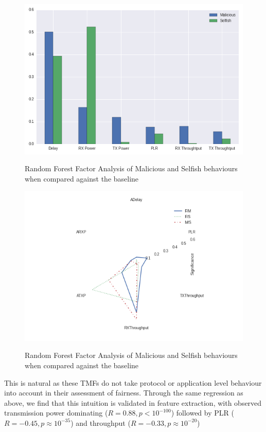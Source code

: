 \documentclass[conference]{IEEEtran}
\begin{document}
\begin{figure}
  \centering
  \includegraphics[width=0.95\linewidth]{img/MaliciousSelfishMetricFactors}\label{fig:malselfactors}
  \caption{Random Forest Factor Analysis of Malicious and Selfish behaviours when compared against the baseline}
\end{figure}
\begin{figure}
  \centering
  \includegraphics[width=0.95\linewidth]{img/MaliciousSelfishMetricFactorsRad}\label{fig:malselfactorsrad}
  \caption{Random Forest Factor Analysis of Malicious and Selfish behaviours when compared against the baseline}
\end{figure}

This is natural as these TMFs do not take protocol or application level behaviour into account in their assessment of fairness.
Through the same regression as above, we find that this intuition is validated in feature extraction, with observed transmission power dominating ($R=0.88, p<10^{-100}$) followed by PLR ($R=-0.45, p\approx10^{-35}$) and throughput ($R=-0.33, p\approx10^{-20}$)
\end{document}
